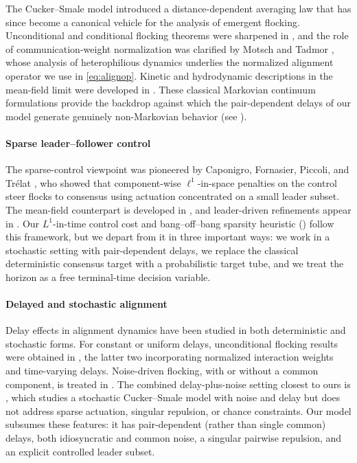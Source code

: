 \documentclass[pdflatex,sn-mathphys-num]{sn-jnl}%
\numberwithin{equation}{section}
\theoremstyle{thmstyleone}%
\theoremstyle{remark}
\theoremstyle{definition}
\begin{document}
The Cucker--Smale model \cite{cucker2007emergent,cucker2007mathematics}
introduced a distance-dependent averaging law that has since become a
canonical vehicle for the analysis of emergent flocking. Unconditional and
conditional flocking theorems were sharpened in \cite{ha2009simple}, and the
role of communication-weight normalization was clarified by Motsch and Tadmor
\cite{motsch2011new,motsch2014heterophilious}, whose analysis of
heterophilious dynamics underlies the normalized alignment operator we use in
\eqref{eq:alignop}. Kinetic and hydrodynamic descriptions in the mean-field
limit were developed in \cite{ha2008particle,carrillo2010asymptotic}. These
classical Markovian continuum formulations provide the backdrop against which
the pair-dependent delays of our model generate genuinely non-Markovian
behavior (see ).

\paragraph{Sparse leader--follower control}

The sparse-control viewpoint was pioneered by Caponigro, Fornasier, Piccoli,
and Tr\'elat \cite{caponigro2013sparse,caponigro2015sparse}, who showed that
component-wise $\ell^1$-in-space penalties on the control steer flocks to
consensus using actuation concentrated on a small leader subset. The
mean-field counterpart is developed in
\cite{fornasier2014mean,bongini2017mean}, and leader-driven refinements
appear in \cite{borzi2015modeling,albi2014boltzmann}. Our $L^1$-in-time
control cost and bang--off--bang sparsity heuristic ()
follow this framework, but we depart from it in three important ways: we
work in a stochastic setting with pair-dependent delays, we replace the
classical deterministic consensus target with a probabilistic target tube,
and we treat the horizon as a free terminal-time decision variable.

\paragraph{Delayed and stochastic alignment}

Delay effects in alignment dynamics have been studied in both deterministic
and stochastic forms. For constant or uniform delays, unconditional flocking
results were obtained in
\cite{liu2014flocking,pignotti2018convergence,choi2017cucker}, the latter two
incorporating normalized interaction weights and time-varying delays.
Noise-driven flocking, with or without a common component, is treated in
\cite{ha2009emergence,ahn2010stochastic,cucker2008flocking}. The combined
delay-plus-noise setting closest to ours is \cite{erban2016cucker}, which
studies a stochastic Cucker--Smale model with noise and delay but does not
address sparse actuation, singular repulsion, or chance constraints. Our
model subsumes these features: it has pair-dependent (rather than single
common) delays, both idiosyncratic and common noise, a singular pairwise
repulsion, and an explicit controlled leader subset.
\end{document}
